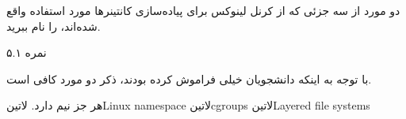 
دو مورد از سه جزئی که از کرنل لینوکس برای پیاده‌سازی کانتینرها مورد استفاده واقع شده‌اند، را نام ببرید.

۵.۱ نمره

\begin{پاسخ}

با توجه به اینکه دانشجویان خیلی فراموش کرده بودند، ذکر دو مورد کافی است.

هر جز نیم دارد.
 ‌لاتین{Linux namespace}
 ‌لاتین{cgroups}
 ‌لاتین{Layered file systems}

\end{پاسخ}
